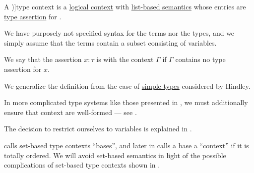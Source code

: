 \begin{definition}\label{def:type_context}
  A \term[en=type-context (\cite[def. 2A5]{Hindley1997BasicSTT})]{type context} is a \hyperref[def:logical_context]{logical context} with \hyperref[def:logical_context_semantics]{list-based semantics} whose entries are \hyperref[def:type_assertion]{type assertion} for .

  We have purposely not specified syntax for the terms nor the types, and we simply assume that the terms contain a subset consisting of variables.

  We say that the assertion \( x: \tau \) is  with the context \( \Gamma \) if \( \Gamma \) contains no type assertion for \( x \).
\end{definition}
\begin{comments}
  \item We generalize the definition from the case of \hyperref[def:simple_type]{simple types} considered by Hindley.

  \item In more complicated type systems like those presented in , we must additionally ensure that context are well-formed --- see .

  \item The decision to restrict ourselves to variables is explained in .

  \item {} calls set-based type contexts \enquote{bases}, and later in \cite[def. 5.1.5]{Barendregt1992LambdaCalculiWithTypes} calls a base a \enquote{context} if it is totally ordered. We will avoid set-based semantics in light of the possible complications of set-based type contexts shown in .
\end{comments}

